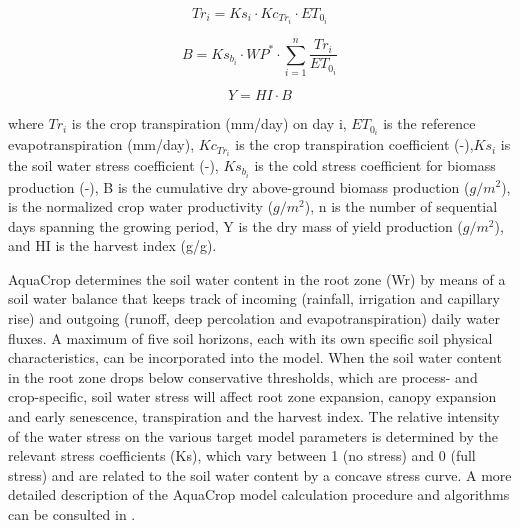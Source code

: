 \begin{equation}
 Tr_{i}=Ks_{i} \cdot Kc_{Tr_{i}} \cdot ET_{0_{i}}
  \label{eq:ch3_Tr}
\end{equation}

\begin{equation}
 B=Ks_{b_{i} } \cdot WP^{*} \cdot \sum_{i=1}^n \frac{Tr_{i}}{ET_{0_{i}}}
 \label{eq:ch3_B}
\end{equation}

\begin{equation}
 Y=HI \cdot B
 \label{eq:ch3_Y}
\end{equation}

where $Tr_{i}$ is the crop transpiration (mm/day) on day i, $ET_{0_{i}}$ is the reference evapotranspiration (mm/day), $Kc_{Tr_{i}}$ is the crop transpiration coefficient (-),$Ks_{i}$ is the soil water stress coefficient (-), $Ks_{b_{i}}$ is the cold stress coefficient for biomass production (-), B is the cumulative dry above-ground biomass production ($g/m^{2}$), \WPster is the normalized crop water productivity ($g/m^{2}$), n is the number of sequential days spanning the growing period, Y is the dry mass of yield production ($g/m^{2}$), and HI is the harvest index (g/g).

AquaCrop determines the soil water content in the root zone (Wr) by means of a soil water balance that keeps track of incoming (rainfall, irrigation and capillary rise) and outgoing (runoff, deep percolation and evapotranspiration) daily water fluxes. A maximum of five soil horizons, each with its own specific soil physical characteristics, can be incorporated into the model. When the soil water content in the root zone drops below conservative thresholds, which are process- and crop-specific, soil water stress will affect root zone expansion, canopy expansion and early senescence, transpiration and the harvest index. The relative intensity of the water stress on the various target model parameters is determined by the relevant stress coefficients (Ks), which vary between 1 (no stress) and 0 (full stress) and are related to the soil water content by a concave stress curve. A more detailed description of the AquaCrop model calculation procedure and algorithms can be consulted in \textcite{raes2009}.

